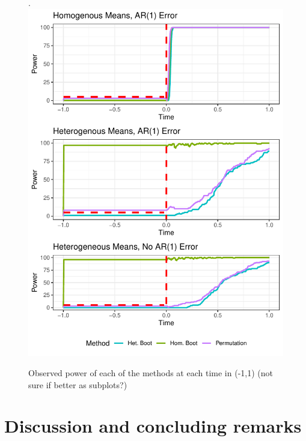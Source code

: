 \documentclass{article}
\begin{document}
\begin{figure}[H]
\centering.
\includegraphics{typeII_time.pdf}
\caption{Observed power of each of the methods at each time in (-1,1) (not sure if better as subplots?)}
\label{fig:time_power_plot}
\end{figure}


\section{Discussion and concluding remarks}
\end{document}
